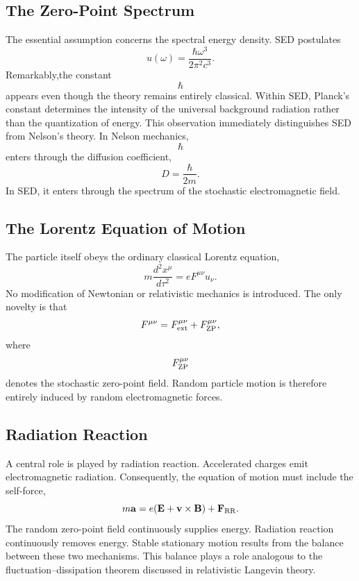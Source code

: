 \subsection{The Zero-Point Spectrum}
The essential assumption concerns the spectral energy density.
SED postulates
\begin{equation}
\boxed{u(\omega)=\frac{\hbar\omega^3}{2\pi^2c^3}.}
\label{eq:ZPSpectrum}
\end{equation}
Remarkably,the constant
\[\hbar\]
appears even though the theory remains entirely classical.
Within SED,
Planck's constant determines the intensity of the universal background
radiation rather than the quantization of energy.
This observation immediately distinguishes SED from Nelson's theory.
In Nelson mechanics,
\[\hbar\]
enters through the diffusion coefficient,
\[D=\frac{\hbar}{2m}.\]
In SED,
it enters through the spectrum of the stochastic electromagnetic field.
\subsection{The Lorentz Equation of Motion}
The particle itself obeys the ordinary classical Lorentz equation,
\begin{equation}
m\frac{d^2x^\mu}{d\tau^2}=eF^{\mu\nu}u_\nu .
\label{eq:LorentzSED}
\end{equation}
No modification of Newtonian or relativistic mechanics is introduced.
The only novelty is that
\[F^{\mu\nu}=F^{\mu\nu}_{\rm ext}+F^{\mu\nu}_{\rm ZP},\]
where
\[F^{\mu\nu}_{\rm ZP}\]
denotes the stochastic zero-point field.
Random particle motion is therefore entirely induced by random
electromagnetic forces.
\subsection{Radiation Reaction}
A central role is played by radiation reaction.
Accelerated charges emit electromagnetic radiation.
Consequently,
the equation of motion must include the self-force,
\begin{equation}
m\mathbf a=e(\mathbf E+\mathbf v\times\mathbf B)+\mathbf F_{\rm RR}.
\end{equation}
The random zero-point field continuously supplies energy.
Radiation reaction continuously removes energy.
Stable stationary motion results from the balance between these two
mechanisms.
This balance plays a role analogous to the
fluctuation--dissipation theorem discussed in relativistic Langevin
theory.
